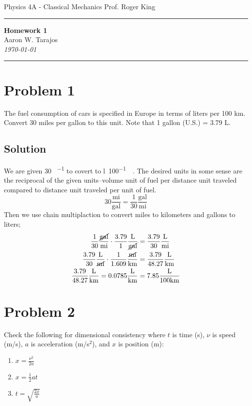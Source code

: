 \documentclass{article}
\newcommand{\mile}{\text{mi}}
\newcommand{\gallon}{\text{gal}}
\newcommand{\kilo}{\text{k}}
\newcommand{\liter}{\text{L}}
\newcommand{\meter}{\text{m}}
\begin{document}
\noindent
Physics 4A - Classical Mechanics \hfill Prof. Roger King

\noindent\rule{\textwidth}{0.4pt}

\begin{center}
    \textbf{\LARGE Homework 1} \\
    \vspace{12pt}
    \large Aaron W. Tarajos \\
    \textit{\today}
\end{center}

\noindent\rule{\textwidth}{0.4pt}

\section*{Problem 1}
The fuel consumption of cars is specified in Europe in terms of liters per 100 km. Convert
30 miles per gallon to this unit. Note that 1 gallon (U.S.) = 3.79 L.

\subsection*{Solution}
We are given 30 \si{{\mile\per\gallon}} to covert to \si{{\litre\per100\kilo\meter}}. The desired units in some sense are the reciprocal of the given units--volume unit of fuel per distance unit traveled compared to distance unit traveled per unit of fuel.
\[
	30 \frac{\mile}{\gallon} = \frac{1}{30} \frac{\text{gal}}{\mile}
\]
Then we use chain multiplaction to convert miles to kilometers and gallons to liters;
\begin{align*}
	\frac{1}{30} \frac{\cancel{\gallon}}{\mile} \cdot \frac{3.79}{1} \frac{\liter}{\cancel{\gallon}} &= \frac{3.79}{30} \frac{\liter}{\mile} \\
	\frac{3.79}{30} \frac{\liter}{\cancel{\mile}} \cdot \frac{1}{1.609} \frac{\cancel{\mile}}{\kilo\meter} &= \frac{3.79}{48.27} \frac{\liter}{\kilo\meter} \\
	\frac{3.79}{48.27} \frac{\liter}{\kilo\meter} = 0.0785 \frac{\liter}{\kilo\meter} &= 7.85 \frac{\liter}{100 \kilo\meter}
\end{align*}

\section*{Problem 2}
Check the following for dimensional consistency where $t$ is time (s), $\nu$ is speed (m/s), $a$ is acceleration (m/s$^2$), and $x$ is position (m):
\begin{enumerate}
	\item $x = \frac{\nu^2}{2a}$
	\item $x = \frac{1}{2}at$
	\item $t = \sqrt{\frac{2x}{a}}$
\end{enumerate}
\end{document}
